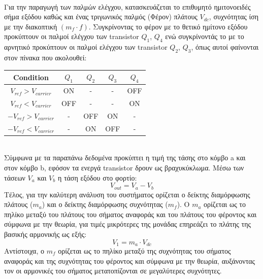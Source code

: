 \noindent\\
Για την παραγωγή των παλμών ελέγχου, κατασκευάζεται το επιθυμητό ημιτονοειδές σήμα εξόδου καθώς και ένας τριγωνικός παλμός (Φέρον) πλάτους $V_{dc}$, συχνότητας ίση με την διακοπτική $(m_f \cdot f)$. Συγκρίνοντας το φέρον με το θετικό ημίτονο εξόδου προκύπτουν οι παλμοί ελέγχου των transistor $Q_1$, $Q_4$ ενώ συγκρίνοντάς το με το αρνητικό προκύπτουν οι παλμοί ελέγχου των transistor $Q_2$, $Q_3$, όπως αυτοί φαίνονται στον πίνακα που ακολουθεί:
\begin{table}[h]
	\centering
	\begin{tabular}{ccccc}
		Condition                                     & $Q_1$ & $Q_2$ & $Q_3$ & $Q_4$ \\ \hline
		\multicolumn{1}{c|}{$V_{ref} > V_{carrier}$}  & ON    & -     & -     & OFF   \\
		\multicolumn{1}{c|}{$V_{ref} < V_{carrier}$}  & OFF   & -     & -     & ON    \\
		\multicolumn{1}{c|}{$-V_{ref} > V_{carrier}$} & -     & OFF   & ON    & -     \\
		\multicolumn{1}{c|}{$-V_{ref} < V_{carrier}$} & -     & ON    & OFF   & -    
	\end{tabular}
\end{table}
\noindent\\
Σύμφωνα με τα παραπάνω δεδομένα προκύπτει η τιμή της τάσης στο κόμβο a και στον κόμβο b, εφόσον τα ενεργά transistor δρουν ως βραχυκύκλωμα. Μέσω των τάσεων $V_a$ και $V_b$ η τάση εξόδου στο φορτίο:
\begin{equation}
	V_{out} = V_a - V_b
\end{equation}
\noindent
Τέλος, για την καλύτερη ανάλυση του συστήματος ορίζεται ο δείκτης διαμόρφωσης πλάτους ($m_a$) και ο δείκτης διαμόρφωσης συχνότητας ($m_f$). Ο  $m_a$ ορίζεται ως το πηλίκο μεταξύ του πλάτους του σήματος αναφοράς και του πλάτους του φέροντος και σύμφωνα με την θεωρία, για τιμές μικρότερες της μονάδας επηρεάζει το πλάτης της βασικής αρμονικής ως εξής:
\begin{equation}
	V_1 = m_a \cdot V_{dc}
\end{equation}
Αντίστοιχα, ο $m_f$ ορίζεται ως το πηλίκο μεταξύ της συχνότητας του σήματος αναφοράς και της συχνότητας του φέροντος και σύμφωνα με την θεωρία, αυξάνοντας τον οι αρμονικές του σήματος μετατοπίζονται σε μεγαλύτερες συχνότητες.